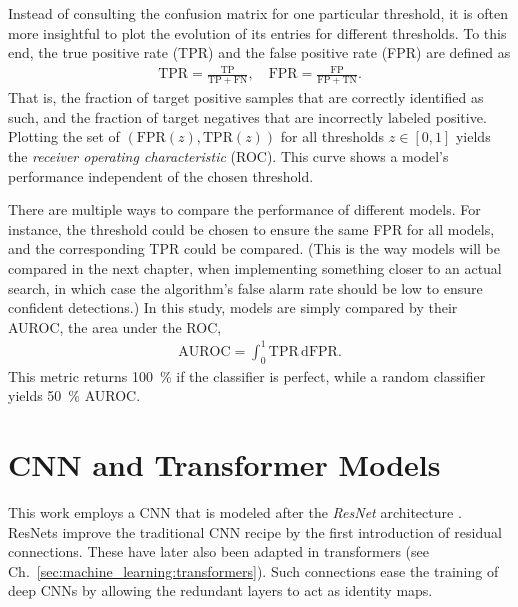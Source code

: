 Instead of consulting the confusion matrix for one particular threshold, it is often more insightful to plot the evolution of its entries for different thresholds. To this end, the true positive rate (TPR) and the false positive rate (FPR) are defined as
\begin{align}
	\mathrm{TPR} = \frac{\mathrm{TP}}{\mathrm{TP} + \mathrm{FN}}, \quad
	\mathrm{FPR} = \frac{\mathrm{FP}}{\mathrm{FP} + \mathrm{TN}}.
\end{align}
That is, the fraction of target positive samples that are correctly identified as such, and the fraction of target negatives that are incorrectly labeled positive. Plotting the set of $(\text{FPR}(z), \text{TPR}(z))$ for all thresholds $z\in[0,1]$ yields the \emph{receiver operating characteristic} (ROC). This curve shows a model's performance independent of the chosen threshold.

There are multiple ways to compare the performance of different models. For instance, the threshold could be chosen to ensure the same FPR for all models, and the corresponding TPR could be compared. (This is the way models will be compared in the next chapter, when implementing something closer to an actual search, in which case the algorithm's false alarm rate should be low to ensure confident detections.) In this study, models are simply compared by their AUROC, the area under the ROC,
\begin{align}
	\mathrm{AUROC} = \int_0^1 \mathrm{TPR}\,\mathrm{d}\mathrm{FPR}.
\end{align}
This metric returns \SI{100}{\percent} if the classifier is perfect, while a random classifier yields \SI{50}{\percent} AUROC.

\section{CNN and Transformer Models}


This work employs a CNN that is modeled after the \emph{ResNet} architecture \cite{he2016residual}. ResNets improve the traditional CNN recipe by the first introduction of residual connections. These have later also been adapted in transformers (see Ch.~\ref{sec:machine_learning:transformers}). Such connections ease the training of deep CNNs by allowing the redundant layers to act as identity maps. 

